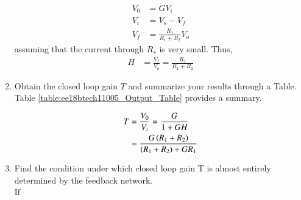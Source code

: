 \begin{enumerate}[label=\thesubsection.\arabic*.,ref=\thesubsection.\theenumi]
\begin{align}
\label{eq:ee18btech11005_opamp_output}
V_0 &= GV_i
\\
 V_i &= V_s -V_f
\\
V_f &= \frac{R_1}{R_1+R_2}V_o
\end{align}
%
assuming that the current through $R_s$ is very small.  Thus, 
\begin{align}
H &=  \frac{V_f}{V_o} = \frac{R_1}{R_1+R_2}
\label{eq:ee18btech11005_H}
\end{align}
\item  Obtain the closed loop gain $T$ and summarize your results through a Table.
\\
\solution Table \ref{table:ee18btech11005_Output_Table} provides a summary.

\begin{align}
\label{eq:ee18btech11005_T}
T &=    \frac{V_0}{V_i}= \frac{G}{1+GH}
  \\
&= \frac{G\left(R_1+R_2\right)}{\left(R_1+R_2\right)+GR_1}
\end{align}
\begin{table}[!ht]
\centering

\caption{}
\label{table:ee18btech11005_Output_Table}
\end{table}
%
\item Find the condition under which closed loop gain T is almost entirely determined by the feedback network.
\\
\solution If 


\end{enumerate}
